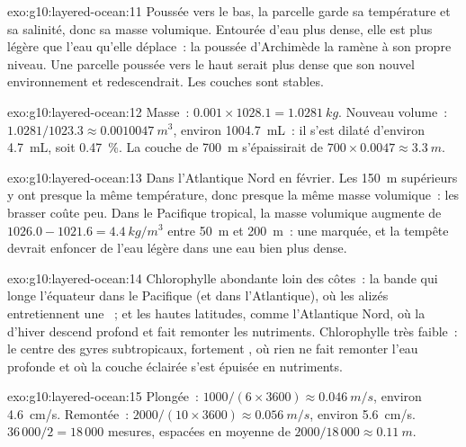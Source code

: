 \begin{solution}{exo:g10:layered-ocean:11}
Poussée vers le bas, la parcelle garde sa température et sa salinité, donc
sa masse volumique. Entourée d'eau plus dense, elle est plus légère que l'eau
qu'elle déplace~: la poussée d'Archimède la ramène à son propre niveau. Une
parcelle poussée vers le haut serait plus dense que son nouvel environnement
et redescendrait. Les couches sont stables.
\end{solution}

\begin{solution}{exo:g10:layered-ocean:12}
Masse~: $0.001 \times 1028.1 = \qty{1.0281}{kg}$. Nouveau volume~: $1.0281/1023.3
\approx \qty{0.0010047}{m^3}$, environ \qty{1004.7}{mL}~: il s'est dilaté
d'environ \qty{4.7}{mL}, soit \qty{0.47}{\percent}. La couche de
\qty{700}{m} s'épaissirait de $700 \times 0.0047 \approx \qty{3.3}{m}$.
\end{solution}

\begin{solution}{exo:g10:layered-ocean:13}
Dans l'Atlantique Nord en février. Les \qty{150}{m} supérieurs y ont presque
la même température, donc presque la même masse volumique~: les brasser
coûte peu. Dans le Pacifique tropical, la masse volumique augmente de
$1026.0 - 1021.6 =
\qty{4.4}{kg/m^3}$ entre \qty{50}{m} et \qty{200}{m}~: une 
marquée, et la tempête devrait enfoncer de l'eau légère dans une eau bien
plus dense.
\end{solution}

\begin{solution}{exo:g10:layered-ocean:14}
Chlorophylle abondante loin des côtes~: la bande qui longe l'équateur dans
le Pacifique (et dans l'Atlantique), où les alizés entretiennent une
~; et les hautes latitudes, comme l'Atlantique Nord, où la
 d'hiver descend profond et fait remonter les nutriments.
Chlorophylle très faible~: le centre des gyres subtropicaux, fortement
, où rien ne fait remonter l'eau profonde et où la couche éclairée
s'est épuisée en nutriments.
\end{solution}

\begin{solution}{exo:g10:layered-ocean:15}
Plongée~: $1000/(6 \times 3600) \approx \qty{0.046}{m/s}$, environ
\qty{4.6}{cm/s}. Remontée~: $2000/(10 \times 3600) \approx \qty{0.056}{m/s}$,
environ \qty{5.6}{cm/s}. $36\,000/2 = 18\,000$ mesures, espacées en moyenne
de $2000/18\,000 \approx \qty{0.11}{m}$.
\end{solution}

